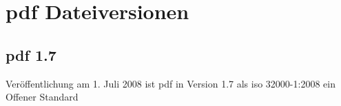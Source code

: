 \section{\gls{pdf} Dateiversionen}

\subsection{\gls{pdf} 1.7}
Veröffentlichung am 1. Juli 2008 ist \gls{pdf} in Version 1.7 als \gls{iso} 32000-1:2008 ein Offener Standard